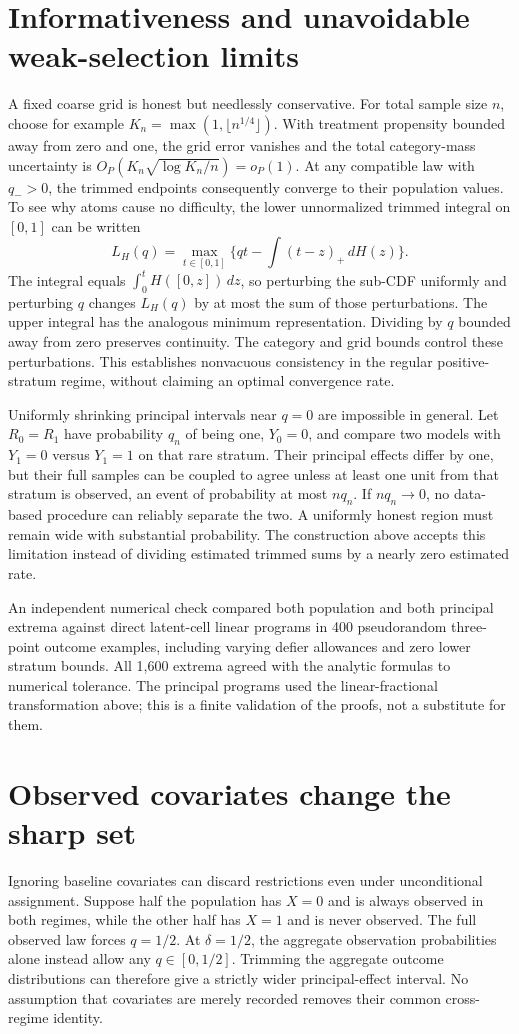 \documentclass[11pt,a4paper]{article}
\begin{document}
\section{Informativeness and unavoidable weak-selection limits}
A fixed coarse grid is honest but needlessly conservative. For total sample size $n$, choose for example $K_n=\max(1,\lfloor n^{1/4}\rfloor)$. With treatment propensity bounded away from zero and one, the grid error vanishes and the total category-mass uncertainty is
$O_P(K_n\sqrt{\log K_n/n})=o_P(1)$. At any compatible law with $q_->0$, the trimmed endpoints consequently converge to their population values. To see why atoms cause no difficulty, the lower unnormalized trimmed integral on $[0,1]$ can be written
\[
 L_H(q)=\max_{t\in[0,1]}\{qt-\int(t-z)_+\,dH(z)\}.
\]
The integral equals $\int_0^tH([0,z])\,dz$, so perturbing the sub-CDF uniformly and perturbing $q$ changes $L_H(q)$ by at most the sum of those perturbations. The upper integral has the analogous minimum representation. Dividing by $q$ bounded away from zero preserves continuity. The category and grid bounds control these perturbations. This establishes nonvacuous consistency in the regular positive-stratum regime, without claiming an optimal convergence rate.

Uniformly shrinking principal intervals near $q=0$ are impossible in general. Let $R_0=R_1$ have probability $q_n$ of being one, $Y_0=0$, and compare two models with $Y_1=0$ versus $Y_1=1$ on that rare stratum. Their principal effects differ by one, but their full samples can be coupled to agree unless at least one unit from that stratum is observed, an event of probability at most $nq_n$. If $nq_n\to0$, no data-based procedure can reliably separate the two. A uniformly honest region must remain wide with substantial probability. The construction above accepts this limitation instead of dividing estimated trimmed sums by a nearly zero estimated rate.

An independent numerical check compared both population and both principal extrema against direct latent-cell linear programs in 400 pseudorandom three-point outcome examples, including varying defier allowances and zero lower stratum bounds. All 1,600 extrema agreed with the analytic formulas to numerical tolerance. The principal programs used the linear-fractional transformation above; this is a finite validation of the proofs, not a substitute for them.

\section{Observed covariates change the sharp set}
Ignoring baseline covariates can discard restrictions even under unconditional assignment. Suppose half the population has $X=0$ and is always observed in both regimes, while the other half has $X=1$ and is never observed. The full observed law forces $q=1/2$. At $\delta=1/2$, the aggregate observation probabilities alone instead allow any $q\in[0,1/2]$. Trimming the aggregate outcome distributions can therefore give a strictly wider principal-effect interval. No assumption that covariates are merely recorded removes their common cross-regime identity.
\end{document}

